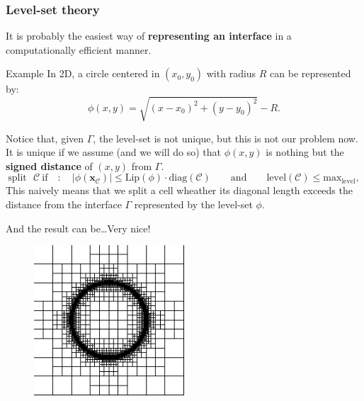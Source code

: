 \documentclass[8pt]{beamer}
\begin{document}
\begin{frame}
  \frametitle{Level-set theory}
It is probably the easiest way of \textbf{representing an interface} in a computationally efficient manner.
\pause
\begin{block}{Example}
 In 2D, a circle centered in $(x_0, y_0)$ with radius $R$ can be represented by:
 \begin{equation*}
  \phi(x,y) = \sqrt{(x-x_0)^2 + (y-y_0)^2} - R.
 \end{equation*}
 \pause
\end{block}
Notice that, given $\Gamma$, the level-set is not unique, but this is not our problem now. It is unique if we assume (and we will do so) that $\phi(x,y)$ is nothing but the \textbf{signed distance} of $(x,y)$ from $\Gamma$.
\pause
\begin{equation*}
 \text{split ~}\mathcal{C} ~ \text{if} \quad : \quad  \left | \phi(\mathbf{x}_{\mathcal{C}}) \right | \leq \text{Lip}(\phi) \cdot \text{diag}(\mathcal{C}) \qquad \text{and} \qquad \text{level}(\mathcal{C}) \leq \textrm{max}_{\textrm{level}},
\end{equation*}
This naively means that we split a cell wheather its diagonal length exceeds the distance from the interface $\Gamma$ represented by the level-set $\phi$.
\end{frame}

\begin{frame}
 And the result can be\dots Very nice!
  \begin{figure}[!h]
\begin{center}
\includegraphics[width=0.5\textwidth]{./figures/integrator/pi_1.pdf}
\end{center}
\end{figure}
 
\end{frame}
\end{document}
